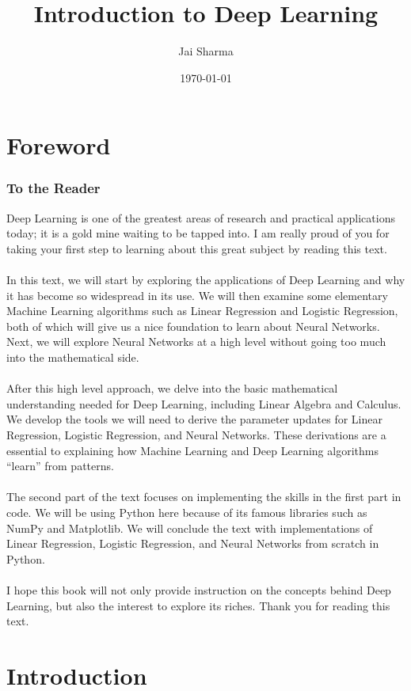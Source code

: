 \documentclass{article}
\title{Introduction to Deep Learning}
\author{Jai Sharma}
\date{\today}
\begin{document}
\maketitle
\clearpage
\hspace{100mm}
\clearpage
\tableofcontents
\clearpage
\part{Foreword}
\section*{To the Reader}
Deep Learning is one of the greatest areas of research and practical applications today; it is a gold mine waiting to be tapped into. I am really proud of you for taking your first step to learning about this great subject by reading this text. 
\\
\\
In this text, we will start by exploring the applications of Deep Learning and why it has become so widespread in its use. We will then examine some elementary Machine Learning algorithms such as Linear Regression and Logistic Regression, both of which will give us a nice foundation to learn about Neural Networks. Next, we will explore Neural Networks at a high level without going too much into the mathematical side.
\\
\\
After this high level approach, we delve into the basic mathematical understanding needed for Deep Learning, including Linear Algebra and Calculus. We develop the tools we will need to derive the parameter updates for Linear Regression, Logistic Regression, and Neural Networks. These derivations are a essential to explaining how Machine Learning and Deep Learning algorithms ``learn'' from patterns.
\\
\\
The second part of the text focuses on implementing the skills in the first part in code. We will be using Python here because of its famous libraries such as NumPy and Matplotlib. We will conclude the text with implementations of Linear Regression, Logistic Regression, and Neural Networks from scratch in Python.
\\
\\
I hope this book will not only provide instruction on the concepts behind Deep Learning, but also the interest to explore its riches. Thank you for reading this text.
\clearpage

\part{Introduction}
\clearpage
\end{document}
